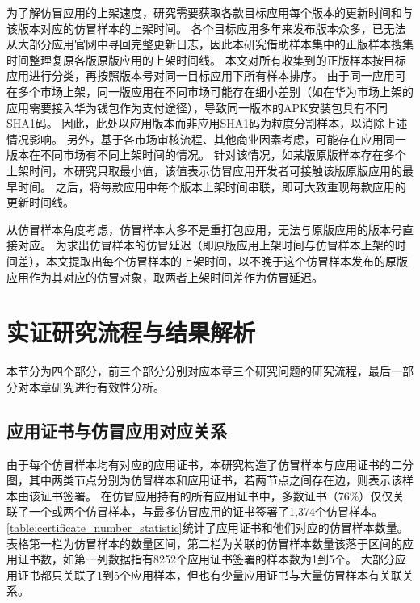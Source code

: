 为了解仿冒应用的上架速度，研究需要获取各款目标应用每个版本的更新时间和与该版本对应的仿冒样本的上架时间。
各个目标应用多年来发布版本众多，已无法从大部分应用官网中寻回完整更新日志，因此本研究借助样本集中的正版样本搜集时间整理复原各版原版应用的上架时间线。
本文对所有收集到的正版样本按目标应用进行分类，再按照版本号对同一目标应用下所有样本排序。
由于同一应用可在多个市场上架，同一版应用在不同市场可能存在细小差别（如在华为市场上架的应用需要接入华为钱包作为支付途径），导致同一版本的APK安装包具有不同SHA1码。
因此，此处以应用版本而非应用SHA1码为粒度分割样本，以消除上述情况影响。
另外，基于各市场审核流程、其他商业因素考虑，可能存在应用同一版本在不同市场有不同上架时间的情况。
针对该情况，如某版原版样本存在多个上架时间，本研究只取最小值，该值表示仿冒应用开发者可接触该版原版应用的最早时间。
之后，将每款应用中每个版本上架时间串联，即可大致重现每款应用的更新时间线。

从仿冒样本角度考虑，仿冒样本大多不是重打包应用，无法与原版应用的版本号直接对应。
为求出仿冒样本的仿冒延迟（即原版应用上架时间与仿冒样本上架的时间差），本文提取出每个仿冒样本的上架时间，以不晚于这个仿冒样本发布的原版应用作为其对应的仿冒对象，取两者上架时间差作为仿冒延迟。

\section{实证研究流程与结果解析}

本节分为四个部分，前三个部分分别对应本章三个研究问题的研究流程，最后一部分对本章研究进行有效性分析。

\subsection{应用证书与仿冒应用对应关系}


由于每个仿冒样本均有对应的应用证书，本研究构造了仿冒样本与应用证书的二分图，其中两类节点分别为仿冒样本和应用证书，若两节点之间存在边，则表示该样本由该证书签署。
在仿冒应用持有的所有应用证书中，多数证书（76\%）仅仅关联了一个或两个仿冒样本，与最多仿冒应用的证书签署了1,374个仿冒样本。
\autoref{table:certificate_number_statistic}统计了应用证书和他们对应的仿冒样本数量。
表格第一栏为仿冒样本的数量区间，第二栏为关联的仿冒样本数量该落于区间的应用证书数，如第一列数据指有8252个应用证书签署的样本数为1到5个。
大部分应用证书都只关联了1到5个应用样本，但也有少量应用证书与大量仿冒样本有关联关系。

